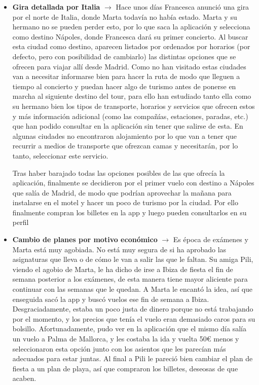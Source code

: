 \begin{itemize}
      \item \textbf{Gira detallada por Italia} $\rightarrow$ Hace unos días Francesca anunció una gira por el norte de Italia, donde Marta todavía no había estado. Marta y su hermano no se pueden perder esto, por lo que saca la aplicación y selecciona como destino Nápoles, donde Francesca dará su primer concierto. Al buscar esta ciudad como destino, aparecen listados por ordenados por horarios (por defecto, pero con posibilidad de cambiarlo) las distintas opciones que se ofrecen para viajar allí desde Madrid. Como no han visitado estas ciudades van a necesitar informarse bien para hacer la ruta de modo que lleguen a tiempo al concierto y puedan hacer algo de turismo antes de ponerse en marcha al siguiente destino del tour, para ello han estudiado tanto ella como su hermano bien los tipos de transporte, horarios y servicios que ofrecen estos y más información adicional (como las compañías, estaciones, paradas, etc.) que han podido consultar en la aplicación sin tener que salirse de esta. En algunas ciudades no encontraron alojamiento por lo que van a tener que recurrir a medios de transporte que ofrezcan camas y necesitarán, por lo tanto, seleccionar este servicio.

            Tras haber barajado todas las opciones posibles de las que ofrecía la
            aplicación, finalmente se decidieron por el primer vuelo con destino a Nápoles
            que salía de Madrid, de modo que podrían aprovechar la mañana para instalarse
            en el motel y hacer un poco de turismo por la ciudad. Por ello finalmente
            compran los billetes en la app y luego pueden consultarlos en su perfil

      \item \textbf{Cambio de planes por motivo económico} $\rightarrow$ Es época de exámenes y Marta está muy agobiada. No está muy segura de si ha aprobado las asignaturas que lleva o de cómo le van a salir las que le faltan. Su amiga Pili, viendo el agobio de Marta, le ha dicho de irse a Ibiza de fiesta el fin de semana posterior a los exámenes, de esta manera tiene mayor aliciente para continuar con las semanas que le quedan. A Marta le encantó la idea, así que enseguida sacó la app y buscó vuelos ese fin de semana a Ibiza. Desgraciadamente, estaba un poco justa de dinero porque no está trabajando por el momento, y los precios que tenía el vuelo eran demasiado caros para su bolsillo. Afortunadamente, pudo ver en la aplicación que el mismo día salía un vuelo a Palma de Mallorca, y les costaba la ida y vuelta 50€ menos y seleccionaron esta opción junto con los asientos que les parecían más adecuados para estar juntas. Al final a Pili le pareció bien cambiar el plan de fiesta a un plan de playa, así que compraron los billetes, deseosas de que acaben.
\end{itemize}
